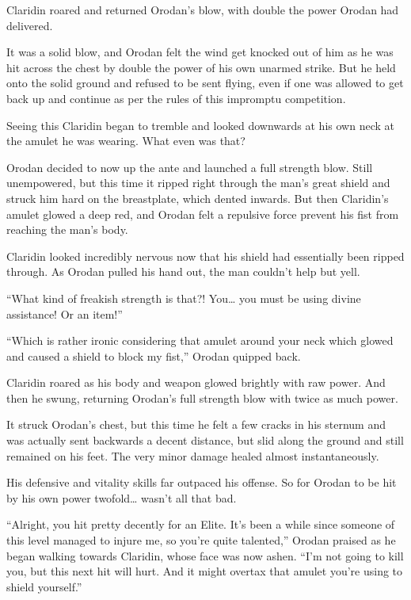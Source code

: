 \documentclass[a4paper,10pt]{book}
\begin{document}
Claridin roared and returned Orodan’s blow, with double the power Orodan had delivered.\par
It was a solid blow, and Orodan felt the wind get knocked out of him as he was hit across the chest by double the power of his own unarmed strike. But he held onto the solid ground and refused to be sent flying, even if one was allowed to get back up and continue as per the rules of this impromptu competition.\par
Seeing this Claridin began to tremble and looked downwards at his own neck at the amulet he was wearing. What even was that?\par
Orodan decided to now up the ante and launched a full strength blow. Still unempowered, but this time it ripped right through the man’s great shield and struck him hard on the breastplate, which dented inwards. But then Claridin’s amulet glowed a deep red, and Orodan felt a repulsive force prevent his fist from reaching the man’s body.\par
Claridin looked incredibly nervous now that his shield had essentially been ripped through. As Orodan pulled his hand out, the man couldn’t help but yell.\par
“What kind of freakish strength is that?! You… you must be using divine assistance! Or an item!”\par
“Which is rather ironic considering that amulet around your neck which glowed and caused a shield to block my fist,” Orodan quipped back.\par
Claridin roared as his body and weapon glowed brightly with raw power. And then he swung, returning Orodan’s full strength blow with twice as much power.\par
It struck Orodan’s chest, but this time he felt a few cracks in his sternum and was actually sent backwards a decent distance, but slid along the ground and still remained on his feet. The very minor damage healed almost instantaneously.\par
His defensive and vitality skills far outpaced his offense. So for Orodan to be hit by his own power twofold… wasn’t all that bad.\par
“Alright, you hit pretty decently for an Elite. It’s been a while since someone of this level managed to injure me, so you’re quite talented,” Orodan praised as he began walking towards Claridin, whose face was now ashen. “I’m not going to kill you, but this next hit will hurt. And it might overtax that amulet you’re using to shield yourself.”\par
\end{document}

